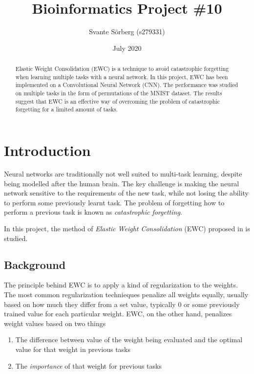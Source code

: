 \documentclass{article}
\title{Bioinformatics Project \#10}
\author{Svante Sörberg (s279331)}
\date{July 2020}
\begin{document}
    \thispagestyle{empty}
    \maketitle
    \begin{abstract}
        \noindent Elastic Weight Consolidation (EWC) is a technique to avoid 
        catastrophic forgetting when learning multiple tasks with a 
        neural network. In this project, EWC has been implemented on 
        a Convolutional Neural Network (CNN). The performance was studied on 
        multiple tasks in the form of permutations of the MNIST dataset. 
        The results suggest that EWC is an effective way of overcoming 
        the problem of catastrophic forgetting for a limited amount of tasks.
    \end{abstract}
    
    \clearpage
    \section*{Introduction}
        Neural networks are traditionally not well suited to multi-task 
        learning, despite being modelled after the human brain. The key
        challenge is making the neural network sensitive to the requirements
        of the new task, while not losing the ability to perform some previously
        learnt task. The problem of forgetting how to perform a previous task is 
        known as \textit{catastrophic forgetting}.

        In this project, the method of \textit{Elastic Weight Consolidation} 
        (EWC) proposed in \cite{kirkpatrick2017overcoming} is studied. 
        
        \subsection*{Background}
        The principle behind EWC is to apply a kind of regularization to the 
        weights. The most common regularization technieques penalize all 
        weights equally, usually based on how much they differ from a set value,
        typically 0 or some previously trained value for each particular weight. 
        EWC, on the other hand, penalizes weight values based on two things
        
        \begin{enumerate}
            \item The difference between value of the weight being evaluated 
        and the optimal value for that weight in previous tasks
            \item The \textit{importance} of that weight for previous tasks
        \end{enumerate}
\end{document}
